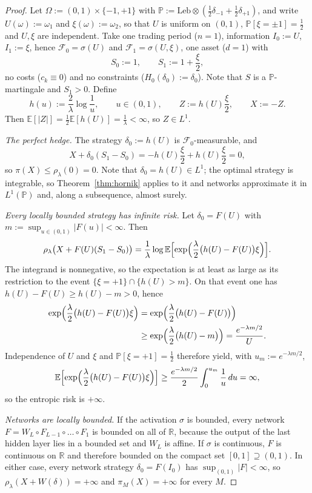 \documentclass[11pt,a4paper]{report}
\numberwithin{equation}{chapter}
\theoremstyle{plain}
\theoremstyle{definition}
\newcommand{\E}{\mathbb{E}}
\newcommand{\PP}{\mathbb{P}}
\newcommand{\R}{\mathbb{R}}
\newcommand{\F}{\mathcal{F}}
\begin{document}
\begin{proof}
  Let $\Omega:=(0,1)\times\{-1,+1\}$ with
  $\PP:=\mathrm{Leb}\otimes(\frac{1}{2}\delta_{-1}+\frac{1}{2}\delta_{+1})$,
  and write $U(\omega):=\omega_1$ and $\xi(\omega):=\omega_2$, so that
  $U$ is uniform on $(0,1)$, $\PP[\xi=\pm1]=\frac{1}{2}$ and $U,\xi$ are
  independent. Take one trading period ($n=1$), information $I_0:=U$,
  $I_1:=\xi$, hence $\F_0=\sigma(U)$ and $\F_1=\sigma(U,\xi)$, one asset
  ($d=1$) with
  \[
    S_0:=1,\qquad S_1:=1+\frac{\xi}{2},
  \]
  no costs ($c_k\equiv0$) and no constraints ($H_0(\delta_0):=\delta_0$).
  Note that $S$ is a $\PP$-martingale and $S_1>0$. Define
  \[
    h(u):=\frac{2}{\lambda}\log\frac{1}{u},\qquad u\in(0,1),\qquad
    Z:=h(U)\frac{\xi}{2},\qquad X:=-Z.
  \]
  Then $\E[|Z|]=\frac{1}{2}\E[h(U)]=\frac{1}{\lambda}<\infty$, so
  $Z\in L^1$.

  \textit{The perfect hedge.}
  The strategy $\delta_0:=h(U)$ is $\F_0$-measurable, and
  \[
    X+\delta_0(S_1-S_0)=-h(U)\frac{\xi}{2}+h(U)\frac{\xi}{2}=0,
  \]
  so $\pi(X)\le\rho_\lambda(0)=0$. Note that $\delta_0=h(U)\in L^1$; the
  optimal strategy is integrable, so Theorem~\ref{thm:hornik} applies to
  it and networks approximate it in $L^1(\PP)$ and, along a subsequence,
  almost surely.

  \textit{Every locally bounded strategy has infinite risk.}
  Let $\delta_0=F(U)$ with $m:=\sup_{u\in(0,1)}|F(u)|<\infty$. Then
  \[
    \rho_\lambda\bigl(X+F(U)(S_1-S_0)\bigr)
    =\frac{1}{\lambda}\log\E\Bigl[\exp\Bigl(\frac{\lambda}{2}\bigl(h(U)-F(U)\bigr)\xi\Bigr)\Bigr].
  \]
  The integrand is nonnegative, so the expectation is at least as large
  as its restriction to the event $\{\xi=+1\}\cap\{h(U)>m\}$. On that
  event one has $h(U)-F(U)\ge h(U)-m>0$, hence
  \begin{align*}
    \exp\Bigl(\frac{\lambda}{2}\bigl(h(U)-F(U)\bigr)\xi\Bigr)
     & =\exp\Bigl(\frac{\lambda}{2}\bigl(h(U)-F(U)\bigr)\Bigr) \\
     & \ge\exp\Bigl(\frac{\lambda}{2}\bigl(h(U)-m\bigr)\Bigr)
    =\frac{e^{-\lambda m/2}}{U}.
  \end{align*}
  Independence of $U$ and $\xi$ and $\PP[\xi=+1]=\frac{1}{2}$ therefore
  yield, with $u_m:=e^{-\lambda m/2}$,
  \[
    \E\Bigl[\exp\Bigl(\frac{\lambda}{2}\bigl(h(U)-F(U)\bigr)\xi\Bigr)\Bigr]
    \ge\frac{e^{-\lambda m/2}}{2}\int_0^{u_m}\frac{1}{u}\,du=\infty,
  \]
  so the entropic risk is $+\infty$.

  \textit{Networks are locally bounded.}
  If the activation $\sigma$ is bounded, every network
  $F=W_L\circ F_{L-1}\circ\dots\circ F_1$ is bounded on all of $\R$,
  because the output of the last hidden layer lies in a bounded set and
  $W_L$ is affine. If $\sigma$ is continuous, $F$ is continuous on $\R$
  and therefore bounded on the compact set $[0,1]\supseteq(0,1)$. In
  either case, every network strategy $\delta_0=F(I_0)$ has
  $\sup_{(0,1)}|F|<\infty$, so $\rho_\lambda(X+W(\delta))=+\infty$ and
  $\pi_M(X)=+\infty$ for every $M$.
\end{proof}
\end{document}
